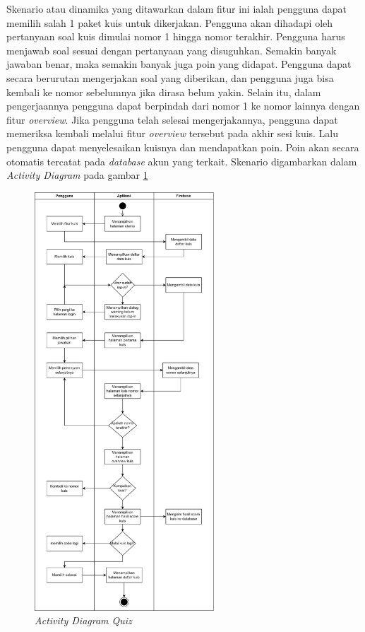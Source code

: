 Skenario atau dinamika yang ditawarkan dalam fitur ini ialah pengguna dapat memilih salah 1 paket kuis untuk dikerjakan. Pengguna akan dihadapi oleh pertanyaan soal kuis dimulai nomor 1 hingga nomor terakhir.
Pengguna harus menjawab soal sesuai dengan pertanyaan yang disuguhkan. Semakin banyak jawaban benar, maka semakin banyak juga poin yang didapat. Pengguna dapat secara berurutan mengerjakan soal yang diberikan, dan pengguna juga bisa kembali ke nomor sebelumnya jika dirasa belum yakin.
Selain itu, dalam pengerjaannya pengguna dapat berpindah dari nomor 1 ke nomor lainnya dengan fitur \textit{overview}. Jika pengguna telah selesai mengerjakannya, pengguna dapat memeriksa kembali melalui fitur \textit{overview} tersebut pada akhir sesi kuis.
Lalu pengguna dapat menyelesaikan kuisnya dan mendapatkan poin. Poin akan secara otomatis tercatat pada \textit{database} akun yang terkait. Skenario digambarkan dalam \textit{Activity Diagram} pada gambar \ref*{fig:ActivityQuiz}


\newpage

\begin{figure}[H]
	\centering
	\includegraphics[width=0.6\textwidth]{contents/chapter-3/images/AD-kuis.png}
	\caption{\textit{Activity Diagram Quiz}}
	\label{fig:ActivityQuiz}
\end{figure}

